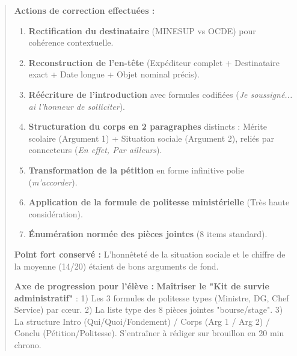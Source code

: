 \documentclass[11pt]{article}
\begin{document}
\begin{exoresolu}
\begin{quote}
\textbf{Actions de correction effectuées :}
\begin{enumerate}
    \item \textbf{Rectification du destinataire} (MINESUP vs OCDE) pour cohérence contextuelle.
    \item \textbf{Reconstruction de l'en-tête} (Expéditeur complet + Destinataire exact + Date longue + Objet nominal précis).
    \item \textbf{Réécriture de l'introduction} avec formules codifiées (\emph{Je soussigné... ai l'honneur de solliciter}).
    \item \textbf{Structuration du corps en 2 paragraphes} distincts : Mérite scolaire (Argument 1) + Situation sociale (Argument 2), reliés par connecteurs (\emph{En effet, Par ailleurs}).
    \item \textbf{Transformation de la pétition} en forme infinitive polie (\emph{m'accorder}).
    \item \textbf{Application de la formule de politesse ministérielle} (Très haute considération).
    \item \textbf{Énumération normée des pièces jointes} (8 items standard).
\end{enumerate}

\textbf{Point fort conservé :} L'honnêteté de la situation sociale et le chiffre de la moyenne (14/20) étaient de bons arguments de fond.

\textbf{Axe de progression pour l'élève :} \textbf{Maîtriser le "Kit de survie administratif"} : 1) Les 3 formules de politesse types (Ministre, DG, Chef Service) par cœur. 2) La liste type des 8 pièces jointes "bourse/stage". 3) La structure Intro (Qui/Quoi/Fondement) / Corps (Arg 1 / Arg 2) / Conclu (Pétition/Politesse). S'entraîner à rédiger sur brouillon en 20 min chrono.
\end{quote}
\end{exoresolu}
\end{document}
